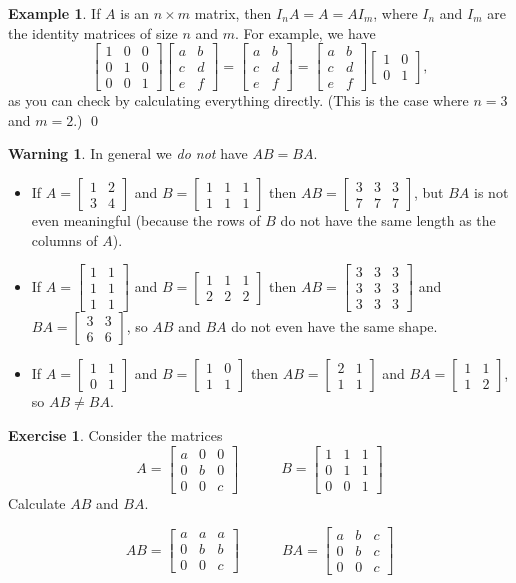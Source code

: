 \documentclass[a4paper]{book}
\newcommand{\RED}[1]{{\color{red}#1}}
\newcommand{\bbm}       {\begin{bmatrix}}
\newcommand{\ebm}       {\end{bmatrix}}
\newcommand{\tm}        {\times}
\renewcommand{\:}{\colon}
\newcommand{\EMPH}[1]{\RED{\emph{#1}}}
\theoremstyle{definition}
\newtheorem{warning}[theorem]{Warning}
\newtheorem{example}[theorem]{Example}
\newtheorem{exercise}[theorem]{Exercise}
\renewenvironment{solution}{\SolutionInline}{\endSolutionInline}
\begin{document}
\begin{example}
 If $A$ is an $n\tm m$ matrix, then $I_nA=A=AI_m$, where $I_n$ and
 $I_m$ are the identity matrices of size $n$ and $m$.  For example, we
 have
 \[ \bbm 1&0&0\\0&1&0\\0&0&1\ebm
    \bbm a&b \\ c&d \\ e&f\ebm = 
    \bbm a&b \\ c&d \\ e&f\ebm = 
    \bbm a&b \\ c&d \\ e&f\ebm 
    \bbm 1&0 \\ 0&1 \ebm,
 \]
 as you can check by calculating everything directly.  (This is the
 case where $n=3$ and $m=2$.) \qed
\end{example}
\begin{warning}
 In general we \EMPH{do not} have $AB=BA$.  
 \begin{itemize}
 \item If $A=\bbm 1&2\\3&4\ebm$ and $B=\bbm 1&1&1\\1&1&1\ebm$ then
  $AB=\bbm 3&3&3\\7&7&7\ebm$, but $BA$ is not even meaningful (because
  the rows of $B$ do not have the same length as the columns of $A$).
 \item If $A=\bbm 1&1\\1&1\\1&1\ebm$ and $B=\bbm 1&1&1\\2&2&2\ebm$
  then $AB=\bbm 3&3&3\\3&3&3\\3&3&3\ebm$ and $BA=\bbm 3&3\\6&6\ebm$,
  so $AB$ and $BA$ do not even have the same shape.
 \item If $A=\bbm 1&1\\0&1\ebm$ and $B=\bbm 1&0\\1&1\ebm$ then
  $AB=\bbm 2&1\\1&1\ebm$ and $BA=\bbm 1&1\\1&2\ebm$, so $AB\neq BA$.
 \end{itemize}
\end{warning}

\begin{exercise}
 Consider the matrices
 \[ A = \bbm a&0&0\\ 0&b&0\\ 0&0&c \ebm \hspace{3em}
    B = \bbm 1&1&1\\ 0&1&1\\ 0&0&1 \ebm
 \]
 Calculate $AB$ and $BA$.
\end{exercise}
\begin{solution}
 \[ AB = \bbm a&a&a\\ 0&b&b\\ 0&0&c \ebm
    \hspace{3em}
    BA = \bbm a&b&c\\ 0&b&c\\ 0&0&c \ebm
 \]
\end{solution}
\end{document}
